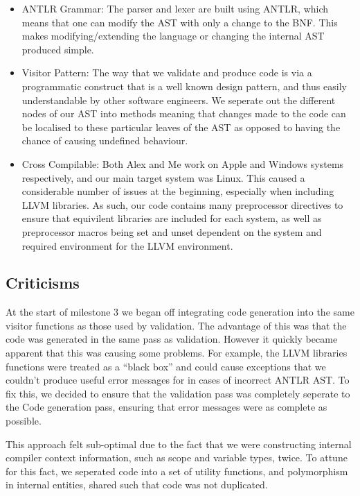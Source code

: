 \documentclass[a4wide, 11pt]{article}
\begin{document}
\begin{itemize}
\item
ANTLR Grammar: The parser and lexer are built using ANTLR, which means that one can modify the AST with only a change to the BNF. This makes modifying/extending the language or changing the internal AST produced simple.
\item
Visitor Pattern: The way that we validate and produce code is via a programmatic construct that is a well known design pattern, and thus easily understandable by other software engineers. We seperate out the different nodes of our AST into methods meaning that changes made to the code can be localised to these particular leaves of the AST as opposed to having the chance of causing undefined behaviour. 
\item
Cross Compilable: Both Alex and Me work on Apple and Windows systems respectively, and our main target system was Linux. This caused a considerable number of issues at the beginning, especially when including LLVM libraries. As such, our code contains many preprocessor directives to ensure that equivilent libraries are included for each system, as well as preprocessor macros being set and unset dependent on the system and required environment for the LLVM environment.
\end{itemize}

\subsection{Criticisms}

At the start of milestone 3 we began off integrating code generation into the same visitor functions as those used by validation. The advantage of this was that the code was generated in the same pass as validation. However it quickly became apparent that this was causing some problems. For example, the LLVM libraries functions were treated as a ``black box'' and could cause exceptions that we couldn't produce useful error messages for in cases of incorrect ANTLR AST. To fix this, we decided to ensure that the validation pass was completely seperate to the Code generation pass, ensuring that error messages were as complete as possible.

This approach felt sub-optimal due to the fact that we were constructing internal compiler context information, such as scope and variable types, twice. To attune for this fact, we seperated code into a set of utility functions, and polymorphism in internal entities, shared such that code was not duplicated.
\end{document}
